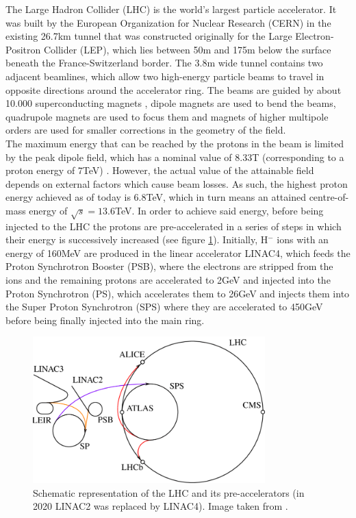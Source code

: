 \documentclass[main]{subfiles} %
\begin{document}
The Large Hadron Collider (LHC) \cite{Evans2008} is the world's largest particle accelerator. It was built by the European Organization for Nuclear Research (CERN) in the existing 26.7\;km tunnel that was constructed originally for the Large Electron-Positron Collider (LEP), which lies between 50\;m and 175\;m below the surface beneath the France-Switzerland border. The 3.8\;m wide tunnel contains two adjacent beamlines, which allow two high-energy particle beams to travel in opposite directions around the accelerator ring. The beams are guided by about 10.000 superconducting magnets \cite{MYERS2013}, dipole magnets are used to bend the beams, quadrupole magnets are used to focus them and magnets of higher multipole orders are used for smaller corrections in the geometry of the field.\\

The maximum energy that can be reached by the protons in the beam is limited by the peak dipole field, which has a nominal value of 8.33\;T (corresponding to a proton energy of 7\;TeV) \cite{Bruning2004}. However, the actual value of the attainable field depends on external factors which cause beam losses. As such, the highest proton energy achieved as of today is 6.8\;TeV, which in turn means an attained centre-of-mass energy of $\sqrt{s} = 13.6$\;TeV. In order to achieve said energy, before being injected to the LHC the protons are pre-accelerated in a series of steps in which their energy is successively increased (see figure \ref{fig:preaccelerators}). Initially, H$^-$ ions with an energy of 160\;MeV are produced in the linear accelerator LINAC4, which feeds the Proton Synchrotron Booster (PSB), where the electrons are stripped from the ions and the remaining protons are accelerated to 2\;GeV and injected into the Proton Synchrotron (PS), which accelerates them to 26\;GeV and injects them into the Super Proton Synchrotron (SPS) where they are accelerated to 450\;GeV before being finally injected into the main ring.\\

\begin{figure}[h]
    \centering
    \includegraphics[width=0.8\textwidth]{../Figures/Theory/LHC_preaccelerators.png}
    \caption{Schematic representation of the LHC and its pre-accelerators (in 2020 LINAC2 was replaced by LINAC4). Image taken from \cite{Michael2011}.}
    \label{fig:preaccelerators}
\end{figure}
\end{document}
